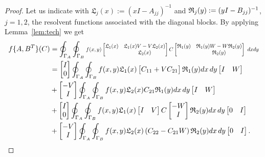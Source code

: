 \documentclass{siamart1116}
\begin{document}
\begin{proof}
	Let us indicate with $\mathfrak L_{j}(x):=(xI-A_{jj})^{-1}$ and $\mathfrak \mathfrak \mathfrak R_{j}(y):=(yI-B_{jj})^{-1}$, $j=1,2$, the resolvent functions associated with the diagonal blocks. By applying Lemma~\ref{lem:tech}  we get
		\begin{align*}
		f\{A, B^T\}(C) &=		\oint_{\Gamma_A}\oint_{\Gamma_B} \resizebox{.7\textwidth}{!}{$f(x,y)\begin{bmatrix}
		\mathfrak L_{1}(x)& \mathfrak L_{1}(x)V-V\mathfrak L_{2}(x)\\
		& \mathfrak L_{2}(x)
		\end{bmatrix} C \begin{bmatrix}
		\mathfrak R_{1}(y)& \mathfrak R_{1}(y)W-W\mathfrak R_{2}(y)\\
		& \mathfrak R_{2}(y)
		\end{bmatrix} \ dx dy$}\\
	&=\begin{bmatrix}
	I \\ 0
	\end{bmatrix}\oint_{\Gamma_A} \oint_{\Gamma_B} f(x,y)\mathfrak L_{1}(x)\begin{bmatrix}
	C_{11}+VC_{21}
	\end{bmatrix}\mathfrak R_{1}(y)dx\, dy\begin{bmatrix}
	I& W
	\end{bmatrix}\\
	&+\begin{bmatrix}
	-V\\ I
	\end{bmatrix}\oint_{\Gamma_A}\oint_{\Gamma_B}f(x,y)\mathfrak L_{2}(x)C_{21}\mathfrak R_{1}(y)dx\, dy\begin{bmatrix}
	I& W
	\end{bmatrix}\\
	&+\begin{bmatrix}
	I \\ 0
	\end{bmatrix}\oint_{\Gamma_A}\oint_{\Gamma_B}f(x,y)\mathfrak L_{1}(x)\begin{bmatrix}
	I& V
	\end{bmatrix}C \begin{bmatrix}
	-W\\ I
	\end{bmatrix}\mathfrak R_{2}(y)dx\, dy \begin{bmatrix}
	0 & I
	\end{bmatrix}\\
	&+\begin{bmatrix}
	-V\\ I
	\end{bmatrix}\oint_{\Gamma_A}\oint_{\Gamma_B}f(x,y)\mathfrak L_{2}(x)\left(
	C_{22}-C_{21}W\right)
	\mathfrak R_{2}(y)dx\, dy\begin{bmatrix}
	0& I
	\end{bmatrix}.
	\end{align*}
\end{proof}
\end{document}

